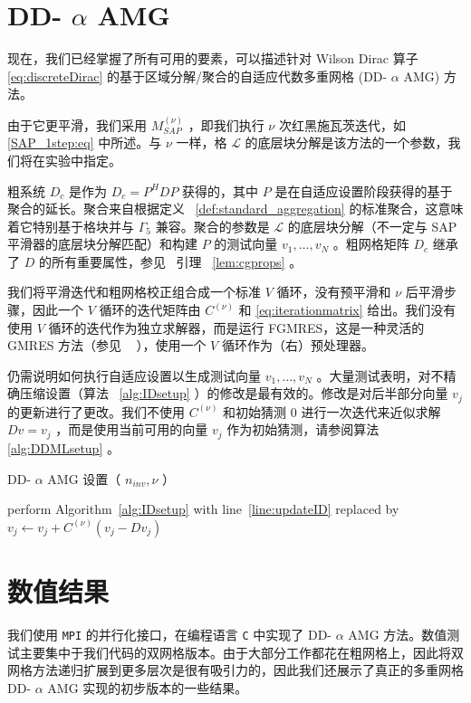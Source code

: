 \documentclass{siamltex}
\newcommand{\MSAP}[1]{M_\mathit{SAP}^{(#1)}}
\newcommand{\ninv}{n_\mathit{inv}}
\begin{document}
\section{DD-    $\alpha$    AMG  }       \label{sec:DDML}    现在，我们已经掌握了所有可用的要素，可以描述针对 Wilson Dirac 算子~    \eqref{eq:discreteDirac}    的基于区域分解/聚合的自适应代数多重网格 (DD-    $\alpha$    AMG) 方法。

由于它更平滑，我们采用    $\MSAP{\nu}$    ，即我们执行    $\nu$    次红黑施瓦茨迭代，如    \eqref{SAP_1step:eq}    中所述。与    $\nu$    一样，格    $\mathcal{L}$    的底层块分解是该方法的一个参数，我们将在实验中指定。

粗系统    $D_c$    是作为    $D_c = P^HDP$    获得的，其中    $P$    是在自适应设置阶段获得的基于聚合的延长。聚合来自根据定义~    \ref{def:standard_aggregation}    的标准聚合，这意味着它特别基于格块并与    $\Gamma_5$    兼容。聚合的参数是    $\mathcal{L}$    的底层块分解（不一定与 SAP 平滑器的底层块分解匹配）和构建    $P$    的测试向量    $v_1,\ldots,v_N$   。粗网格矩阵    $D_c$    继承了    $D$    的所有重要属性，参见 \  引理~    \ref{lem:cgprops}   。

我们将平滑迭代和粗网格校正组合成一个标准    $V$    循环，没有预平滑和    $\nu$    后平滑步骤，因此一个    $V$    循环的迭代矩阵由    $C^{(\nu)}$    和    \eqref{eq:iterationmatrix}    给出。我们没有使用    $V$    循环的迭代作为独立求解器，而是运行 FGMRES，这是一种灵活的 GMRES 方法（参见 \     \cite{Saad:2003:IMS:829576}    ），使用一个    $V$    循环作为（右）预处理器。

仍需说明如何执行自适应设置以生成测试向量    $v_1,\ldots,v_N$    。大量测试表明，对不精确压缩设置（算法~    \ref{alg:IDsetup}    ）的修改是最有效的。修改是对后半部分向量    $v_j$    的更新进行了更改。我们不使用    $C^{(\nu)}$    和初始猜测    $0$    进行一次迭代来近似求解    $Dv=v_j$    ，而是使用当前可用的向量    $v_j$    作为初始猜测，请参阅算法~    \ref{alg:DDMLsetup}    。
\begin{algorithm}[ht]
  \SetNoFillComment
  \caption{DD-    $\alpha$    AMG 设置（    $\ninv,\nu$    ）  }\label{alg:vcycle_inv_iter}
  \label{alg:DDMLsetup}
  perform Algorithm~\ref{alg:IDsetup} with line~\ref{line:updateID}
  replaced by \;
  $v_j \leftarrow v_j + C^{(\nu)} (v_j - D v_j) $          \qquad
\end{algorithm}
\section{数值结果  }       \label{sec:NR}    我们使用    \texttt{MPI}    的并行化接口，在编程语言    \texttt{C}    中实现了 DD-    $\alpha$    AMG 方法。数值测试主要集中于我们代码的双网格版本。由于大部分工作都花在粗网格上，因此将双网格方法递归扩展到更多层次是很有吸引力的，因此我们还展示了真正的多重网格 DD-   $\alpha$    AMG 实现的初步版本的一些结果。
\end{document}
